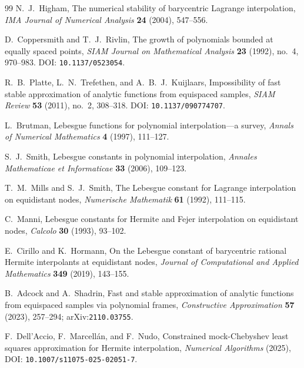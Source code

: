 \documentclass[11pt,oneside]{article}
\theoremstyle{definition}
\theoremstyle{remark}
\begin{document}
\begin{thebibliography}{99}
N.~J.~Higham,
\newblock The numerical stability of barycentric Lagrange interpolation,
\newblock \emph{IMA Journal of Numerical Analysis} \textbf{24} (2004), 547--556.

D.~Coppersmith and T.~J.~Rivlin,
\newblock The growth of polynomials bounded at equally spaced points,
\newblock \emph{SIAM Journal on Mathematical Analysis} \textbf{23} (1992), no.~4, 970--983.
\newblock DOI: \nolinkurl{10.1137/0523054}.

R.~B.~Platte, L.~N.~Trefethen, and A.~B.~J.~Kuijlaars,
\newblock Impossibility of fast stable approximation of analytic functions from equispaced samples,
\newblock \emph{SIAM Review} \textbf{53} (2011), no.~2, 308--318.
\newblock DOI: \nolinkurl{10.1137/090774707}.

L.~Brutman,
\newblock Lebesgue functions for polynomial interpolation---a survey,
\newblock \emph{Annals of Numerical Mathematics} \textbf{4} (1997), 111--127.

S.~J.~Smith,
\newblock Lebesgue constants in polynomial interpolation,
\newblock \emph{Annales Mathematicae et Informaticae} \textbf{33} (2006), 109--123.

T.~M.~Mills and S.~J.~Smith,
\newblock The Lebesgue constant for Lagrange interpolation on equidistant nodes,
\newblock \emph{Numerische Mathematik} \textbf{61} (1992), 111--115.

C.~Manni,
\newblock Lebesgue constants for Hermite and Fejer interpolation on equidistant nodes,
\newblock \emph{Calcolo} \textbf{30} (1993), 93--102.

E.~Cirillo and K.~Hormann,
\newblock On the Lebesgue constant of barycentric rational Hermite interpolants at equidistant nodes,
\newblock \emph{Journal of Computational and Applied Mathematics} \textbf{349} (2019), 143--155.

B.~Adcock and A.~Shadrin,
\newblock Fast and stable approximation of analytic functions from equispaced samples via polynomial frames,
\newblock \emph{Constructive Approximation} \textbf{57} (2023), 257--294; arXiv:\nolinkurl{2110.03755}.

F.~Dell'Accio, F.~Marcell{\'a}n, and F.~Nudo,
\newblock Constrained mock-Chebyshev least squares approximation for Hermite interpolation,
\newblock \emph{Numerical Algorithms} (2025), DOI: \nolinkurl{10.1007/s11075-025-02051-7}.


\end{thebibliography}
\end{document}
